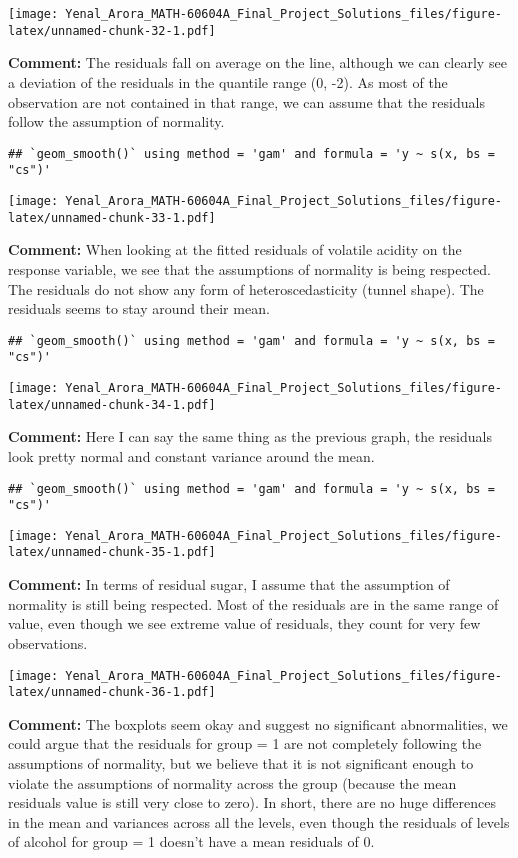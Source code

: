 \documentclass[
]{article}
\begin{document}
\texttt{[image: Yenal\_Arora\_MATH-60604A\_Final\_Project\_Solutions\_files/figure-latex/unnamed-chunk-32-1.pdf]}

\textbf{Comment:} The residuals fall on average on the line, although we
can clearly see a deviation of the residuals in the quantile range (0,
-2). As most of the observation are not contained in that range, we can
assume that the residuals follow the assumption of normality.

\begin{verbatim}
## `geom_smooth()` using method = 'gam' and formula = 'y ~ s(x, bs = "cs")'
\end{verbatim}

\texttt{[image: Yenal\_Arora\_MATH-60604A\_Final\_Project\_Solutions\_files/figure-latex/unnamed-chunk-33-1.pdf]}

\textbf{Comment:} When looking at the fitted residuals of volatile
acidity on the response variable, we see that the assumptions of
normality is being respected. The residuals do not show any form of
heteroscedasticity (tunnel shape). The residuals seems to stay around
their mean.

\begin{verbatim}
## `geom_smooth()` using method = 'gam' and formula = 'y ~ s(x, bs = "cs")'
\end{verbatim}

\texttt{[image: Yenal\_Arora\_MATH-60604A\_Final\_Project\_Solutions\_files/figure-latex/unnamed-chunk-34-1.pdf]}

\textbf{Comment:} Here I can say the same thing as the previous graph,
the residuals look pretty normal and constant variance around the mean.

\begin{verbatim}
## `geom_smooth()` using method = 'gam' and formula = 'y ~ s(x, bs = "cs")'
\end{verbatim}

\texttt{[image: Yenal\_Arora\_MATH-60604A\_Final\_Project\_Solutions\_files/figure-latex/unnamed-chunk-35-1.pdf]}

\textbf{Comment:} In terms of residual sugar, I assume that the
assumption of normality is still being respected. Most of the residuals
are in the same range of value, even though we see extreme value of
residuals, they count for very few observations.

\texttt{[image: Yenal\_Arora\_MATH-60604A\_Final\_Project\_Solutions\_files/figure-latex/unnamed-chunk-36-1.pdf]}

\textbf{Comment:} The boxplots seem okay and suggest no significant
abnormalities, we could argue that the residuals for group = 1 are not
completely following the assumptions of normality, but we believe that
it is not significant enough to violate the assumptions of normality
across the group (because the mean residuals value is still very close
to zero). In short, there are no huge differences in the mean and
variances across all the levels, even though the residuals of levels of
alcohol for group = 1 doesn't have a mean residuals of 0.
\end{document}
